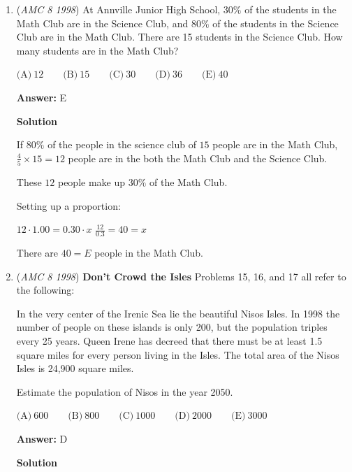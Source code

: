 \begin{enumerate}
 Divide the square into 16 smaller squares as shown. The shaded square is formed from 4 half-squares, so its area is 2. The ratio 2 to 16 is 1/8.

 


	\item (\textit{AMC 8 1998}) At Annville Junior High School, $30\%$ of the students in the Math Club are in the Science Club, and $80\%$ of the students in the Science Club are in the Math Club.  There are 15 students in the Science Club.  How many students are in the Math Club?


 $\text{(A)}\ 12 \qquad \text{(B)}\ 15 \qquad \text{(C)}\ 30 \qquad \text{(D)}\ 36 \qquad \text{(E)}\ 40$

 \textbf{Answer: }E



\textbf{Solution}

If $80\%$ of the people in the science club of $15$ people are in the Math Club, $\frac{4}{5}\times15=12$ people are in the both the Math Club and the Science Club.

 These $12$ people make up $30\%$ of the Math Club.

 Setting up a proportion:

 $12\cdot 1.00 =0.30\cdot x$
$\frac{12}{0.3} = 40=x$

 There are $40=\boxed{E}$ people in the Math Club.

 


	\item (\textit{AMC 8 1998}) \textbf{Don't Crowd the Isles} Problems 15, 16, and 17 all refer to the following:


 
In the very center of the Irenic Sea lie the beautiful Nisos Isles.  In 1998 the number of people on these islands is only 200, but the population triples every 25 years.  Queen Irene has decreed that there must be at least 1.5 square miles for every person living in the Isles.  The total area of the Nisos Isles is 24,900 square miles.


 


 Estimate the population of Nisos in the year 2050.


 $\text{(A)}\ 600 \qquad \text{(B)}\ 800 \qquad \text{(C)}\ 1000 \qquad \text{(D)}\ 2000 \qquad \text{(E)}\ 3000$

 \textbf{Answer: }D



\textbf{Solution}


\end{enumerate}
